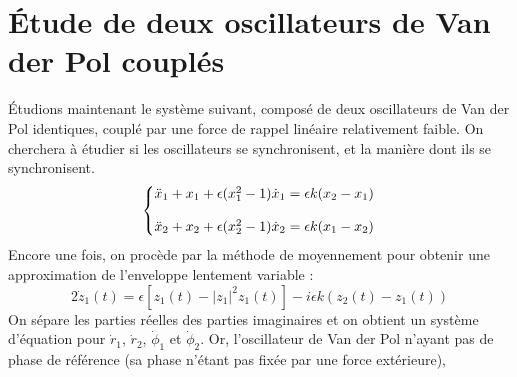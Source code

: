 \chapter{Étude de deux oscillateurs de Van der Pol couplés}
%
Étudions maintenant le système suivant, composé de deux oscillateurs de Van der Pol identiques, couplé par une force de rappel linéaire relativement faible. On cherchera à étudier si les oscillateurs se synchronisent, et la manière dont ils se synchronisent.
%
\begin{equation}
  \left\{\begin{array}{@{}l@{}}
    \ddot{x}_1 + x_1  + \epsilon(x_1^2 - 1)\dot{x}_1 = \epsilon k(x_2 - x_1) \\
    \\
    \ddot{x}_2 + x_2 + \epsilon(x_2^2 - 1)\dot{x}_2 = \epsilon k(x_1 - x_2)
  \end{array}\right.\,
  \label{eq:coupled_vdp}
\end{equation}
%
Encore une fois, on procède par la méthode de moyennement pour obtenir une approximation de l'enveloppe lentement variable :
%
\begin{equation}
    2\dot{z}_1(t) = 
     \epsilon \left[ z_1(t) - |z_1|^2z_1(t) \right]
    - i\epsilon k\left( z_2(t) - z_1(t)\right)
\end{equation}
%
On sépare les parties réelles des parties imaginaires et on obtient un système d'équation pour $\dot{r}_1$,  $\dot{r}_2$,  $\dot{\phi}_1$ et  $\dot{\phi}_2$. %
%
%
%
%
Or, l'oscillateur de Van der Pol n'ayant pas de phase de référence (sa phase n'étant pas fixée par une force extérieure), 
